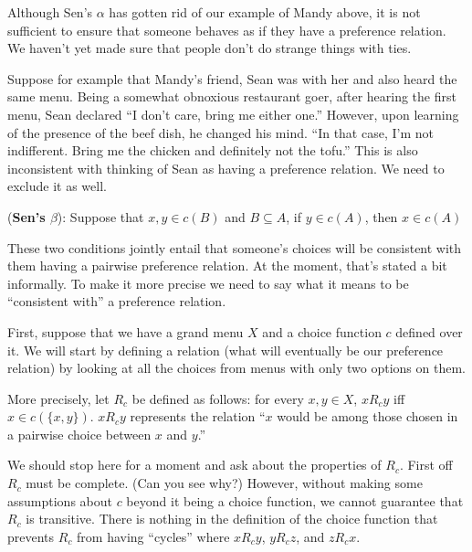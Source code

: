 Although Sen's $\alpha$ has gotten rid of our example of Mandy above, it is not sufficient to ensure that someone behaves as if they have a preference relation.  We haven't yet made sure that people don't do strange things with ties.  

Suppose for example that Mandy's friend, Sean was with her and also heard the same menu.  Being a somewhat obnoxious restaurant goer, after hearing the first menu, Sean declared ``I don't care, bring me either one.''  However, upon learning of the presence of the beef dish, he changed his mind.  ``In that case, I'm not indifferent.  Bring me the chicken and definitely not the tofu.''  This is also inconsistent with thinking of Sean as having a preference relation. We need to exclude it as well.

\begin{definition}
({\bf Sen's $\beta$}): Suppose that $x, y \in c(B)$ and $B \subseteq A$, if $y \in c(A)$, then $x \in c(A)$
\end{definition}

These two conditions jointly entail that someone's choices will be consistent with them having a pairwise preference relation.  At the moment, that's stated a bit informally.  To make it more precise we need to say what it means to be ``consistent with'' a preference relation.

First, suppose that we have a grand menu $X$ and a choice function $c$ defined over it.  We will start by defining a relation (what will eventually be our preference relation) by looking at all the choices from menus with only two options on them. 

More precisely, let $R_c$ be defined as follows: for every $x, y \in X$, $x R_c y$ iff $x \in c(\{x,y\})$.  $x R_c y$ represents the relation ``$x$ would be among those chosen in a pairwise choice between $x$ and $y$.''



We should stop here for a moment and ask about the properties of $R_c$.  First off $R_c$ must be complete.  (Can you see why?) However, without making some assumptions about $c$ beyond it being a choice function, we cannot guarantee that $R_c$ is transitive. There is nothing in the definition of the choice function that prevents $R_c$ from having ``cycles'' where $x R_c y$, $y R_c z$, and $z R_c x$.

